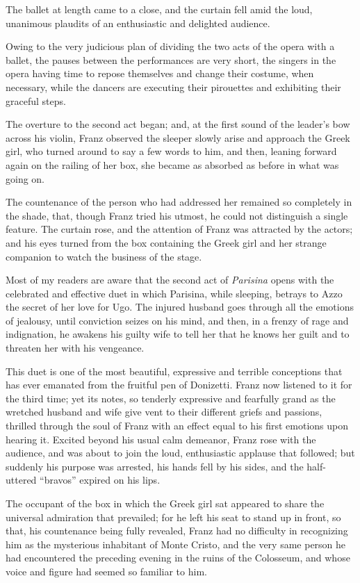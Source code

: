 The ballet at length came to a close, and the curtain fell amid the
loud, unanimous plaudits of an enthusiastic and delighted audience.

Owing to the very judicious plan of dividing the two acts of the opera
with a ballet, the pauses between the performances are very short, the
singers in the opera having time to repose themselves and change their
costume, when necessary, while the dancers are executing their
pirouettes and exhibiting their graceful steps.

The overture to the second act began; and, at the first sound of the
leader’s bow across his violin, Franz observed the sleeper slowly arise
and approach the Greek girl, who turned around to say a few words to
him, and then, leaning forward again on the railing of her box, she
became as absorbed as before in what was going on.

The countenance of the person who had addressed her remained so
completely in the shade, that, though Franz tried his utmost, he could
not distinguish a single feature. The curtain rose, and the attention
of Franz was attracted by the actors; and his eyes turned from the box
containing the Greek girl and her strange companion to watch the
business of the stage.

Most of my readers are aware that the second act of \textit{Parisina} opens
with the celebrated and effective duet in which Parisina, while
sleeping, betrays to Azzo the secret of her love for Ugo. The injured
husband goes through all the emotions of jealousy, until conviction
seizes on his mind, and then, in a frenzy of rage and indignation, he
awakens his guilty wife to tell her that he knows her guilt and to
threaten her with his vengeance.

This duet is one of the most beautiful, expressive and terrible
conceptions that has ever emanated from the fruitful pen of Donizetti.
Franz now listened to it for the third time; yet its notes, so tenderly
expressive and fearfully grand as the wretched husband and wife give
vent to their different griefs and passions, thrilled through the soul
of Franz with an effect equal to his first emotions upon hearing it.
Excited beyond his usual calm demeanor, Franz rose with the audience,
and was about to join the loud, enthusiastic applause that followed;
but suddenly his purpose was arrested, his hands fell by his sides, and
the half-uttered “bravos” expired on his lips.

The occupant of the box in which the Greek girl sat appeared to share
the universal admiration that prevailed; for he left his seat to stand
up in front, so that, his countenance being fully revealed, Franz had
no difficulty in recognizing him as the mysterious inhabitant of Monte
Cristo, and the very same person he had encountered the preceding
evening in the ruins of the Colosseum, and whose voice and figure had
seemed so familiar to him.

